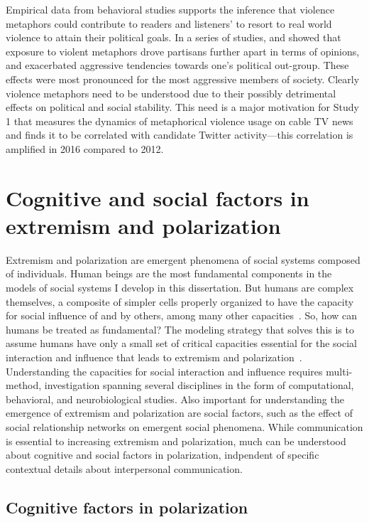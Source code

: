 \documentclass[12pt,letterpaper]{article}
\begin{document}
Empirical data from behavioral studies supports the inference
that violence metaphors could contribute to readers and 
listeners' to resort to real world violence to attain their political goals.
In a series of studies,  and  showed that
exposure to violent metaphors drove partisans further apart in terms of opinions, and 
exacerbated aggressive tendencies towards one's political out-group. These effects
were most pronounced for the most aggressive members of society. Clearly violence
metaphors need to be understood due to their possibly detrimental 
effects on political and social stability. This need is a major motivation for
Study 1 that measures the dynamics of metaphorical violence usage on cable
TV news and finds it to be correlated with candidate Twitter activity---this
correlation is amplified in 2016 compared to 2012.


\section{Cognitive and social factors in extremism and polarization}

Extremism and polarization are emergent phenomena of social systems composed
of individuals. Human beings are the most fundamental components in the
models of social systems I develop in this dissertation. 
But humans are complex themselves,
a composite of simpler cells properly organized to have the capacity for
social influence of and by others, among many other 
capacities~\cite{Kello2007,Spivey2020}. 
So, how can humans be treated as fundamental?
The modeling strategy that solves this is to assume humans 
have only a small set of critical
capacities essential for the social interaction and 
influence that leads to extremism and polarization~\cite{Cartwright1989,Smaldino2017}. 
Understanding the capacities for social interaction and influence requires multi-method,
investigation spanning several disciplines in the form of computational,
behavioral, and neurobiological studies. Also important for understanding
the emergence of extremism and polarization are social factors, such as
the effect of social relationship networks on emergent
social phenomena. While communication is essential to increasing extremism and
polarization, much can be understood about cognitive and social factors
in polarization, indpendent of specific contextual details about interpersonal 
communication.



\subsection{Cognitive factors in polarization}
\end{document}
